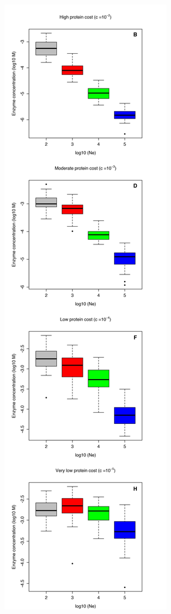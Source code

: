 \begin{figure}[!p]
\begin{center}
\begin{minipage}[c]{0.4\textwidth}
  \includegraphics[scale=0.52,trim=0cm 0cm 0cm 0cm,clip]{pics/SM-Enzymes/Evo_Conc_Results_CostCrow.jpeg}
  \end{minipage}
\label{fig8a3-ann}
\end{center}
\end{figure}

